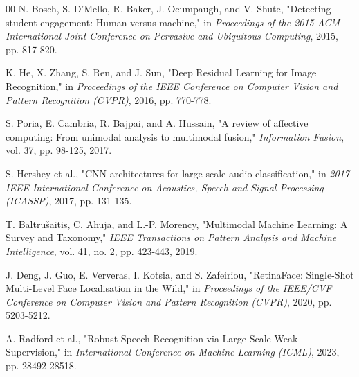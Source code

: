 \documentclass[conference]{IEEEtran}
\begin{document}
\begin{thebibliography}{00}
 N. Bosch, S. D'Mello, R. Baker, J. Ocumpaugh, and V. Shute, "Detecting student engagement: Human versus machine," in \textit{Proceedings of the 2015 ACM International Joint Conference on Pervasive and Ubiquitous Computing}, 2015, pp. 817-820.


 K. He, X. Zhang, S. Ren, and J. Sun, "Deep Residual Learning for Image Recognition," in \textit{Proceedings of the IEEE Conference on Computer Vision and Pattern Recognition (CVPR)}, 2016, pp. 770-778.

 S. Poria, E. Cambria, R. Bajpai, and A. Hussain, "A review of affective computing: From unimodal analysis to multimodal fusion," \textit{Information Fusion}, vol. 37, pp. 98-125, 2017.

 S. Hershey et al., "CNN architectures for large-scale audio classification," in \textit{2017 IEEE International Conference on Acoustics, Speech and Signal Processing (ICASSP)}, 2017, pp. 131-135.

 T. Baltrušaitis, C. Ahuja, and L.-P. Morency, "Multimodal Machine Learning: A Survey and Taxonomy," \textit{IEEE Transactions on Pattern Analysis and Machine Intelligence}, vol. 41, no. 2, pp. 423-443, 2019.

 J. Deng, J. Guo, E. Ververas, I. Kotsia, and S. Zafeiriou, "RetinaFace: Single-Shot Multi-Level Face Localisation in the Wild," in \textit{Proceedings of the IEEE/CVF Conference on Computer Vision and Pattern Recognition (CVPR)}, 2020, pp. 5203-5212.

 A. Radford et al., "Robust Speech Recognition via Large-Scale Weak Supervision," in \textit{International Conference on Machine Learning (ICML)}, 2023, pp. 28492-28518.

\end{thebibliography}
\end{document}
